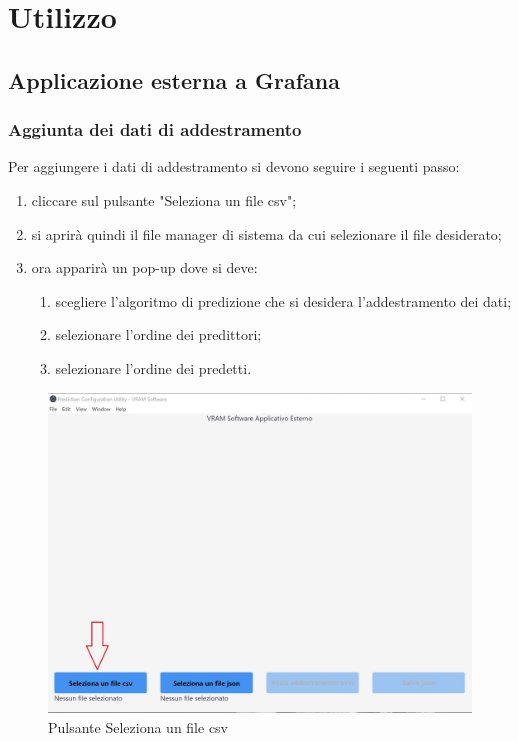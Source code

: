 \section{Utilizzo}
	\subsection{Applicazione esterna a Grafana}
		\subsubsection{Aggiunta dei dati di addestramento}
		Per aggiungere i dati di addestramento si devono seguire i seguenti passo:
		\begin{enumerate}
			\item cliccare sul pulsante "Seleziona un file csv";
			\item si aprirà quindi il file manager di sistema da cui selezionare il file desiderato;
			\item ora apparirà un pop-up dove si deve:
			\begin{enumerate}
				\item scegliere l'algoritmo di predizione che si desidera l'addestramento dei dati;
				\item selezionare l'ordine dei predittori;
				\item selezionare l'ordine dei predetti.
			\end{enumerate}
		\end{enumerate}
		\mbox{}
		\begin{figure} [H]
			\begin{center}
				\includegraphics[width=120mm]{./img/1.jpg}
			\end{center}
			\caption{Pulsante Seleziona un file csv}
		\end{figure}
